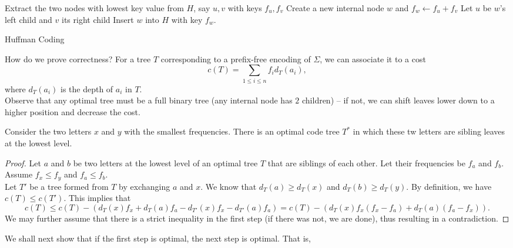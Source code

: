 \begin{algorithm*}
	\DontPrintSemicolon
	\SetNoFillComment
	 {
		Extract the two nodes with lowest key value from $H$, say $u,v$ with keys $f_u,f_v$\;
		Create a new internal node $w$ and $f_w\gets f_u+f_v$\;
		Let $u$ be $w$'s left child and $v$ its right child\;
		Insert $w$ into $H$ with key $f_w$.
	}
	\caption{Huffman Coding}\label{algo: huffman coding}
\end{algorithm*}

How do we prove correctness? For a tree $T$ corresponding to a prefix-free encoding of $\Sigma$, we can associate it to a cost 
\[ c(T) = \sum_{1\leq i\leq n} f_i d_T(a_i), \]
where $d_T(a_i)$ is the depth of $a_i$ in $T$.\\
Observe that any optimal tree must be a full binary tree (any internal node has $2$ children) -- if not, we can shift leaves lower down to a higher position and decrease the cost.\\

\begin{lemma}
	Consider the two letters $x$ and $y$ with the smallest frequencies. There is an optimal code tree $T^*$ in which these tw letters are sibling leaves at the lowest level.
\end{lemma}

\begin{proof}
	Let $a$ and $b$ be two letters at the lowest level of an optimal tree $T$ that are siblings of each other. Let their frequencies be $f_a$ and $f_b$. Assume $f_x\leq f_y$ and $f_a\leq f_b$.\\
	Let $T'$ be a tree formed from $T$ by exchanging $a$ and $x$. We know that $d_T(a)\geq d_T(x)$ and $d_T(b)\geq d_T(y)$. By definition, we have $c(T)\leq c(T')$. This implies that
	\[ c(T) \leq c(T) - \left(d_T(x)f_x + d_T(a)f_a - d_{T'}(x)f_x - d_{T'}(a)f_a\right) = c(T) - \left(d_T(x)f_x (f_x-f_a) + d_T(a)(f_a-f_x)\right). \]
	We may further assume that there is a strict inequality in the first step (if there was not, we are done), thus resulting in a contradiction.
\end{proof}

We shall next show that if the first step is optimal, the next step is optimal. That is,

